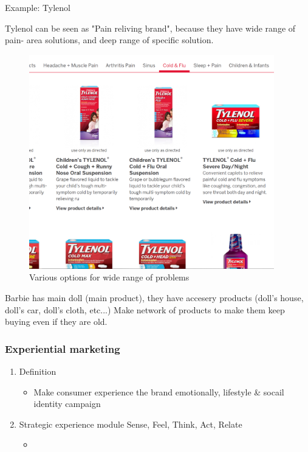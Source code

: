 \documentclass[12pt]{article}
\begin{document}
\begin{itemize}
Example: Tylenol

Tylenol can be seen as "Pain reliving brand", because they have wide range of pain- area solutions, and deep range of specific solution.

\begin{figure}[H]
	\centering
	\includegraphics[width=0.95\textwidth]{img/ty.png}
	\caption{Various options for wide range of problems}
	\label{}
\end{figure}



Barbie has main doll (main product), they have accesery products (doll's house, doll's car, doll's cloth, etc...)
Make network of products to make them keep buying even if they are old.

\subsubsection{Experiential marketing}

\begin{enumerate}
	\item Definition
	\begin{itemize}
		\item Make consumer experience the brand emotionally, lifestyle \& socail identity campaign
	\end{itemize}
	\item Strategic experience module
	Sense, Feel, Think, Act, Relate
	\begin{itemize}
		\item
	\end{itemize}
\end{enumerate}


\end{itemize}
\end{document}
